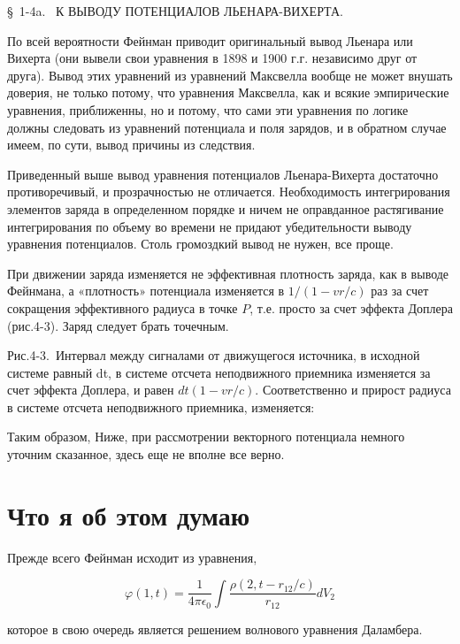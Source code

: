 \documentclass{article}
\begin{document}
§ 1-4a.  К ВЫВОДУ ПОТЕНЦИАЛОВ ЛЬЕНАРА-ВИХЕРТА.

По всей вероятности Фейнман приводит оригинальный вывод Льенара или Вихерта (они вывели свои уравнения в 1898 и 1900 г.г. независимо друг от друга). Вывод этих уравнений из уравнений Максвелла вообще не может внушать доверия, не только потому, что уравнения Максвелла, как и всякие эмпирические уравнения, приближенны, но и потому, что сами эти уравнения по логике должны следовать из уравнений потенциала и поля зарядов, и в обратном случае имеем, по сути, вывод причины из следствия. 

Приведенный выше вывод уравнения потенциалов Льенара-Вихерта достаточно противоречивый, и прозрачностью не отличается. Необходимость интегрирования элементов заряда в определенном порядке и ничем не оправданное растягивание интегрирования по объему во времени не придают убедительности выводу уравнения потенциалов. Столь громоздкий вывод не нужен, все проще. 

При движении заряда изменяется не эффективная плотность заряда, как в выводе Фейнмана, а «плотность» потенциала изменяется в $1/(1 - vr/c)$ раз за счет сокращения эффективного радиуса в точке $P$, т.е. просто за счет эффекта Доплера (рис.4-3). Заряд следует брать точечным. 


Рис.4-3. Интервал между сигналами от движущегося источника, в исходной системе равный dt, в системе отсчета неподвижного приемника изменяется за счет эффекта Доплера, и равен $dt (1 - vr /c)$. Соответственно и прирост радиуса в системе отсчета неподвижного приемника, изменяется: %

Таким образом,
Ниже, при рассмотрении векторного потенциала немного уточним сказанное, здесь еще не вполне все верно.


\section{Что я об этом думаю}

Прежде всего Фейнман исходит из уравнения, 

$$\varphi(1,t) = \frac{1}{4\pi\epsilon_0}\int\frac{\rho(2,t-r_{12}/c)}{r_{12}}dV_{2}$$

которое в свою очередь является решением волнового уравнения Даламбера.

\end{document}
